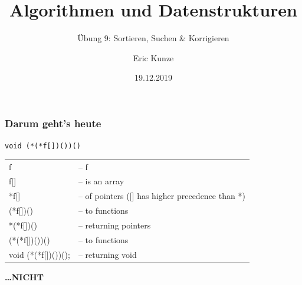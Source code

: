 \documentclass{beamer}
\begin{document}
	
	\title{Algorithmen und Datenstrukturen}
	\subtitle{Übung 9: Sortieren, Suchen \& Korrigieren}
	\author{Eric Kunze}
	\date{19.12.2019}

	\maketitle



\begin{frame} \frametitle{Darum geht's heute}
	\centering
	
	{\LARGE \texttt{void (*(*f[])())()}} \\
	\vspace{2em}
	
	\begin{ttfamily}
		\begin{tabular}{ll}
			f              & -- f \\
			f[]            & -- is an array \\
			*f[]           & -- of pointers  ([] has higher precedence than *) \\
			(*f[])()       & -- to functions \\
			*(*f[])()      & -- returning pointers \\
			(*(*f[])())()  & -- to functions \\
			void (*(*f[])())(); & -- returning void \\
		\end{tabular}
	\end{ttfamily}

	\pause
	\vspace{3em}
	{\LARGE \textbf{\dots NICHT} \smiley
}\end{frame}
\end{document}
